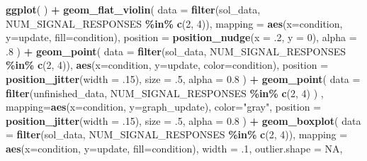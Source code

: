 \documentclass[
]{book}
\newenvironment{Shaded}{\begin{snugshade}}{\end{snugshade}}
\newcommand{\DataTypeTok}[1]{\textcolor[rgb]{0.13,0.29,0.53}{#1}}
\newcommand{\DecValTok}[1]{\textcolor[rgb]{0.00,0.00,0.81}{#1}}
\newcommand{\FloatTok}[1]{\textcolor[rgb]{0.00,0.00,0.81}{#1}}
\newcommand{\KeywordTok}[1]{\textcolor[rgb]{0.13,0.29,0.53}{\textbf{#1}}}
\newcommand{\NormalTok}[1]{#1}
\newcommand{\OperatorTok}[1]{\textcolor[rgb]{0.81,0.36,0.00}{\textbf{#1}}}
\newcommand{\OtherTok}[1]{\textcolor[rgb]{0.56,0.35,0.01}{#1}}
\newcommand{\StringTok}[1]{\textcolor[rgb]{0.31,0.60,0.02}{#1}}
\begin{document}
\begin{Shaded}
\begin{Highlighting}[]
\KeywordTok{ggplot}\NormalTok{( ) }\OperatorTok{+}
\StringTok{  }\KeywordTok{geom\_flat\_violin}\NormalTok{(}
    \DataTypeTok{data =} \KeywordTok{filter}\NormalTok{(sol\_data, NUM\_SIGNAL\_RESPONSES }\OperatorTok{\%in\%}\StringTok{ }\KeywordTok{c}\NormalTok{(}\DecValTok{2}\NormalTok{, }\DecValTok{4}\NormalTok{)),}
    \DataTypeTok{mapping =} \KeywordTok{aes}\NormalTok{(}\DataTypeTok{x=}\NormalTok{condition, }\DataTypeTok{y=}\NormalTok{update, }\DataTypeTok{fill=}\NormalTok{condition),}
    \DataTypeTok{position =} \KeywordTok{position\_nudge}\NormalTok{(}\DataTypeTok{x =} \FloatTok{.2}\NormalTok{, }\DataTypeTok{y =} \DecValTok{0}\NormalTok{),}
    \DataTypeTok{alpha =} \FloatTok{.8}
\NormalTok{  ) }\OperatorTok{+}
\StringTok{  }\KeywordTok{geom\_point}\NormalTok{(}
    \DataTypeTok{data =} \KeywordTok{filter}\NormalTok{(sol\_data, NUM\_SIGNAL\_RESPONSES }\OperatorTok{\%in\%}\StringTok{ }\KeywordTok{c}\NormalTok{(}\DecValTok{2}\NormalTok{, }\DecValTok{4}\NormalTok{)),}
    \KeywordTok{aes}\NormalTok{(}\DataTypeTok{x=}\NormalTok{condition, }\DataTypeTok{y=}\NormalTok{update, }\DataTypeTok{color=}\NormalTok{condition),}
    \DataTypeTok{position =} \KeywordTok{position\_jitter}\NormalTok{(}\DataTypeTok{width =} \FloatTok{.15}\NormalTok{),}
    \DataTypeTok{size =} \FloatTok{.5}\NormalTok{,}
    \DataTypeTok{alpha =} \FloatTok{0.8}
\NormalTok{  ) }\OperatorTok{+}
\StringTok{  }\KeywordTok{geom\_point}\NormalTok{(}
    \DataTypeTok{data =} \KeywordTok{filter}\NormalTok{(unfinished\_data, NUM\_SIGNAL\_RESPONSES }\OperatorTok{\%in\%}\StringTok{ }\KeywordTok{c}\NormalTok{(}\DecValTok{2}\NormalTok{, }\DecValTok{4}\NormalTok{) ) ,}
    \DataTypeTok{mapping=}\KeywordTok{aes}\NormalTok{(}\DataTypeTok{x=}\NormalTok{condition, }\DataTypeTok{y=}\NormalTok{graph\_update),}
    \DataTypeTok{color=}\StringTok{"gray"}\NormalTok{,}
    \DataTypeTok{position =} \KeywordTok{position\_jitter}\NormalTok{(}\DataTypeTok{width =} \FloatTok{.15}\NormalTok{),}
    \DataTypeTok{size =} \FloatTok{.5}\NormalTok{,}
    \DataTypeTok{alpha =} \FloatTok{0.8}
\NormalTok{  ) }\OperatorTok{+}
\StringTok{  }\KeywordTok{geom\_boxplot}\NormalTok{(}
    \DataTypeTok{data =} \KeywordTok{filter}\NormalTok{(sol\_data, NUM\_SIGNAL\_RESPONSES }\OperatorTok{\%in\%}\StringTok{ }\KeywordTok{c}\NormalTok{(}\DecValTok{2}\NormalTok{, }\DecValTok{4}\NormalTok{)),}
    \DataTypeTok{mapping =} \KeywordTok{aes}\NormalTok{(}\DataTypeTok{x=}\NormalTok{condition, }\DataTypeTok{y=}\NormalTok{update, }\DataTypeTok{fill=}\NormalTok{condition),}
    \DataTypeTok{width =} \FloatTok{.1}\NormalTok{,}
    \DataTypeTok{outlier.shape =} \OtherTok{NA}\NormalTok{,}

\end{Highlighting}
\end{Shaded}
\end{document}
